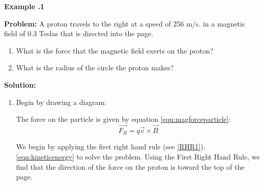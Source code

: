 		
	\begin{mdframed}[backgroundcolor=blue!10!white]
		\begin{center}
			
			
			\textbf{Example \thesection.1}	
		\end{center}
		
		\textbf{Problem: } A proton travels to the right at a speed of 256 m/s. in a magnetic field of 0.3 Teslas that is directed into the page.
		
		  \begin{enumerate}[label=(\alph*)]
			\item What is the force that the magnetic field exerts on the proton?
			\item What is the radius of the circle the proton makes?
		\end{enumerate}
		
		\textbf{Solution:} 
		\begin{enumerate}[label=(\alph*)]
		\item Begin by drawing a diagram:
		\vspace{0.1in}
		\begin{center}
			
		\end{center}
		
		The force on the particle is given by equation \ref{eqn:magforceparticle}:
			\begin{equation*}
			\overrightarrow{F_B} = q \vec{v} \times \vec{B}
		\end{equation*}
		
		
	 We begin by applying the first right hand rule (see \cref{RHR1}).  
	  \eqref{eqn:kineticenergy} to solve the problem.  Using the First Right Hand Rule, we find that the direction of the force on the proton is toward the top of the page.  
	  

\end{enumerate}
\end{mdframed}
